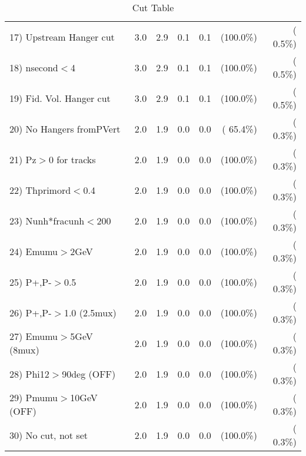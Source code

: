 \begin{table}[h!]
\begin{tabular}{||l||r|r|r|r|r|r||}
 17) Upstream Hanger cut  &          3.0 &          2.9 &          0.1 &          0.1 & (100.0\%) & (  0.5\%) \\
 18) nsecond$<$4          &          3.0 &          2.9 &          0.1 &          0.1 & (100.0\%) & (  0.5\%) \\
 19) Fid. Vol. Hanger cut &          3.0 &          2.9 &          0.1 &          0.1 & (100.0\%) & (  0.5\%) \\
 20) No Hangers fromPVert &          2.0 &          1.9 &          0.0 &          0.0 & ( 65.4\%) & (  0.3\%) \\
 21) Pz$>$0 for tracks    &          2.0 &          1.9 &          0.0 &          0.0 & (100.0\%) & (  0.3\%) \\
 22) Thprimord$<$0.4      &          2.0 &          1.9 &          0.0 &          0.0 & (100.0\%) & (  0.3\%) \\
 23) Nunh*fracunh$<$200   &          2.0 &          1.9 &          0.0 &          0.0 & (100.0\%) & (  0.3\%) \\
 24) Emumu$>$2GeV         &          2.0 &          1.9 &          0.0 &          0.0 & (100.0\%) & (  0.3\%) \\
 25) P+,P-$>$0.5          &          2.0 &          1.9 &          0.0 &          0.0 & (100.0\%) & (  0.3\%) \\
 26) P+,P-$>$1.0 (2.5mux) &          2.0 &          1.9 &          0.0 &          0.0 & (100.0\%) & (  0.3\%) \\
 27) Emumu$>$5GeV  (8mux) &          2.0 &          1.9 &          0.0 &          0.0 & (100.0\%) & (  0.3\%) \\
 28) Phi12$>$90deg  (OFF) &          2.0 &          1.9 &          0.0 &          0.0 & (100.0\%) & (  0.3\%) \\
 29) Pmumu$>$10GeV  (OFF) &          2.0 &          1.9 &          0.0 &          0.0 & (100.0\%) & (  0.3\%) \\
 30) No cut, not set      &          2.0 &          1.9 &          0.0 &          0.0 & (100.0\%) & (  0.3\%) \\
 \hline
 \hline
 \end{tabular}
 \caption{Cut Table           }
 \label{tab-cutcohjpsi-mumu_cohpip}
 \end{table}
